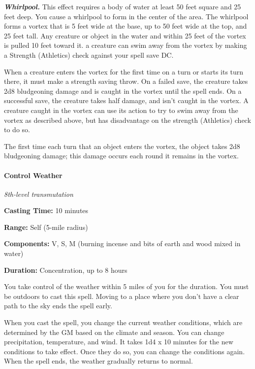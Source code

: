 \documentclass[
]{article}
\begin{document}
\emph{\textbf{Whirlpool.}} This effect requires a body of water at least
50 feet square and 25 feet deep. You cause a whirlpool to form in the
center of the area. The whirlpool forms a vortex that is 5 feet wide at
the base, up to 50 feet wide at the top, and 25 feet tall. Any creature
or object in the water and within 25 feet of the vortex is pulled 10
feet toward it. a creature can swim away from the vortex by making a
Strength (Athletics) check against your spell save DC.

When a creature enters the vortex for the first time on a turn or starts
its turn there, it must make a strength saving throw. On a failed save,
the creature takes 2d8 bludgeoning damage and is caught in the vortex
until the spell ends. On a successful save, the creature takes half
damage, and isn't caught in the vortex. A creature caught in the vortex
can use its action to try to swim away from the vortex as described
above, but has disadvantage on the strength (Athletics) check to do so.

The first time each turn that an object enters the vortex, the object
takes 2d8 bludgeoning damage; this damage occurs each round it remains
in the vortex.

\hypertarget{control-weather}{%
\paragraph{Control Weather}\label{control-weather}}

\emph{8th-level transmutation}

\textbf{Casting Time:} 10 minutes

\textbf{Range:} Self (5-mile radius)

\textbf{Components:} V, S, M (burning incense and bits of earth and wood
mixed in water)

\textbf{Duration:} Concentration, up to 8 hours

You take control of the weather within 5 miles of you for the duration.
You must be outdoors to cast this spell. Moving to a place where you
don't have a clear path to the sky ends the spell early.

When you cast the spell, you change the current weather conditions,
which are determined by the GM based on the climate and season. You can
change precipitation, temperature, and wind. It takes 1d4 x 10 minutes
for the new conditions to take effect. Once they do so, you can change
the conditions again. When the spell ends, the weather gradually returns
to normal.
\end{document}
